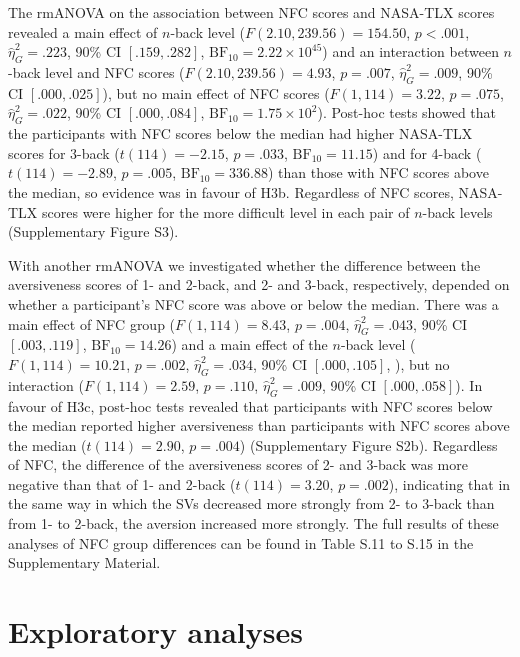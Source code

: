 \documentclass[
  man,floatsintext]{apa6}
\begin{document}
The rmANOVA on the association between NFC scores and NASA-TLX scores revealed a main effect of \(n\)-back level (\(F(2.10, 239.56) = 154.50\), \(p < .001\), \(\hat{\eta}^2_G = .223\), 90\% CI \([.159, .282]\), \(\mathrm{BF}_{\textrm{10}} = 2.22 \times 10^{45}\)) and an interaction between \(n\)-back level and NFC scores (\(F(2.10, 239.56) = 4.93\), \(p = .007\), \(\hat{\eta}^2_G = .009\), 90\% CI \([.000, .025]\)), but no main effect of NFC scores (\(F(1, 114) = 3.22\), \(p = .075\), \(\hat{\eta}^2_G = .022\), 90\% CI \([.000, .084]\), \(\mathrm{BF}_{\textrm{10}} = 1.75 \times 10^{2}\)).
Post-hoc tests showed that the participants with NFC scores below the median had higher NASA-TLX scores for 3-back (\(t(114) = -2.15\), \(p = .033\), \(\mathrm{BF}_{\textrm{10}} = 11.15\)) and for 4-back (\(t(114) = -2.89\), \(p = .005\), \(\mathrm{BF}_{\textrm{10}} = 336.88\)) than those with NFC scores above the median, so evidence was in favour of H3b.
Regardless of NFC scores, NASA-TLX scores were higher for the more difficult level in each pair of \(n\)-back levels (Supplementary Figure S3).

With another rmANOVA we investigated whether the difference between the aversiveness scores of 1- and 2-back, and 2- and 3-back, respectively, depended on whether a participant's NFC score was above or below the median.
There was a main effect of NFC group (\(F(1, 114) = 8.43\), \(p = .004\), \(\hat{\eta}^2_G = .043\), 90\% CI \([.003, .119]\), \(\mathrm{BF}_{\textrm{10}} = 14.26\)) and a main effect of the \(n\)-back level (\(F(1, 114) = 10.21\), \(p = .002\), \(\hat{\eta}^2_G = .034\), 90\% CI \([.000, .105]\), ), but no interaction (\(F(1, 114) = 2.59\), \(p = .110\), \(\hat{\eta}^2_G = .009\), 90\% CI \([.000, .058]\)).
In favour of H3c, post-hoc tests revealed that participants with NFC scores below the median reported higher aversiveness than participants with NFC scores above the median (\(t(114) = 2.90\), \(p = .004\)) (Supplementary Figure S2b).
Regardless of NFC, the difference of the aversiveness scores of 2- and 3-back was more negative than that of 1- and 2-back (\(t(114) = 3.20\), \(p = .002\)), indicating that in the same way in which the SVs decreased more strongly from 2- to 3-back than from 1- to 2-back, the aversion increased more strongly.
The full results of these analyses of NFC group differences can be found in Table S.11 to S.15 in the Supplementary Material.

\hypertarget{exploratory-analyses}{%
\section{Exploratory analyses}\label{exploratory-analyses}}
\end{document}
